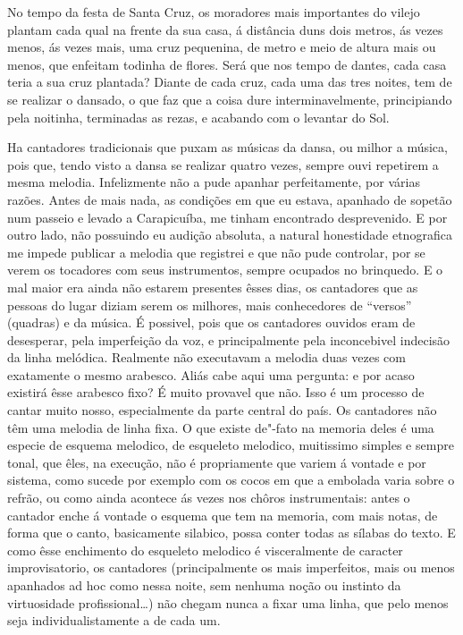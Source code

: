 No tempo da festa de Santa Cruz, os moradores mais importantes do vilejo
plantam cada qual na frente da sua casa, á distância duns dois metros,
ás vezes menos, ás vezes mais, uma cruz pequenina, de metro e meio de
altura mais ou menos, que enfeitam todinha de flores. Será que nos tempo
de dantes, cada casa teria a sua cruz plantada? Diante de cada cruz,
cada uma das tres noites, tem de se realizar o dansado, o que faz que a
coisa dure interminavelmente, principiando pela noitinha, terminadas as
rezas, e acabando com o levantar do Sol.

Ha cantadores tradicionais que puxam as músicas da dansa, ou milhor a
música, pois que, tendo visto a dansa se realizar quatro vezes, sempre
ouvi repetirem a mesma melodia. Infelizmente não a pude apanhar
perfeitamente, por várias razões. Antes de mais nada, as condições em
que eu estava, apanhado de sopetão num passeio e levado a Carapicuíba,
me tinham encontrado desprevenido. E por outro lado, não possuindo eu
audição absoluta, a natural honestidade etnografica me impede publicar a
melodia que registrei e que não pude controlar, por se verem os
tocadores com seus instrumentos, sempre ocupados no brinquedo. E o mal
maior era ainda não estarem presentes êsses dias, os cantadores que as
pessoas do lugar diziam serem os milhores, mais conhecedores de
``versos'' (quadras) e da música. É possivel, pois que os cantadores
ouvidos eram de desesperar, pela imperfeição da voz, e principalmente
pela inconcebivel indecisão da linha melódica. Realmente não executavam
a melodia duas vezes com exatamente o mesmo arabesco. Aliás cabe aqui
uma pergunta: e por acaso existirá êsse arabesco fixo? É muito provavel
que não. Isso é um processo de cantar muito nosso, especialmente da
parte central do país. Os cantadores não têm uma melodia de linha fixa.
O que existe de"-fato na memoria deles é uma especie de esquema melodico,
de esqueleto melodico, muitissimo simples e sempre tonal, que êles, na
execução, não é propriamente que variem á vontade e por sistema, como
sucede por exemplo com os cocos em que a embolada varia sobre o refrão,
ou como ainda acontece ás vezes nos chôros instrumentais: antes o
cantador enche á vontade o esquema que tem na memoria, com mais notas,
de forma que o canto, basicamente silabico, possa conter todas as
sílabas do texto. E como êsse enchimento do esqueleto melodico é
visceralmente de caracter improvisatorio, os cantadores (principalmente
os mais imperfeitos, mais ou menos apanhados ad hoc como nessa noite,
sem nenhuma noção ou instinto da virtuosidade profissional\ldots{}) não
chegam nunca a fixar uma linha, que pelo menos seja individualistamente
a de cada um.

